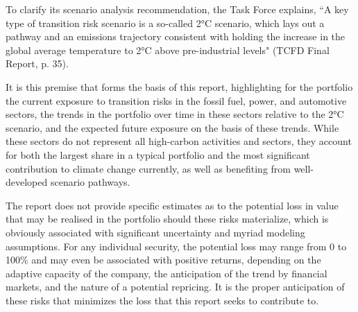 \documentclass[10pt,table,a4]{article}\usepackage[]{graphicx}\usepackage[]{color}
\begin{document}
\begin{multicols}{2}
		To clarify its scenario analysis recommendation, the Task Force explains, ``A key type of transition risk scenario is a so-called 2°C scenario, which lays out a pathway and an emissions trajectory consistent with holding the increase in the global average temperature to 2°C above pre-industrial levels" (TCFD Final Report, p. 35).
		
		It is this premise that forms the basis of this report, highlighting for the portfolio the current exposure to transition risks in the fossil fuel, power, and automotive sectors, the trends in the portfolio over time in these sectors relative to the 2°C scenario, and the expected future exposure on the basis of these trends. While these sectors do not represent all high-carbon activities and sectors, they account for both the largest share in a typical portfolio and the most significant contribution to climate change currently, as well as benefiting from well-developed scenario pathways.
		
		The report does not provide specific estimates as to the potential loss in value that may be realised in the portfolio should these risks materialize, which is obviously associated with significant uncertainty and myriad modeling assumptions. For any individual security, the potential loss may range from 0 to 100\% and may even be associated with positive returns, depending on the adaptive capacity of the company, the anticipation of the trend by financial markets, and the nature of a potential repricing. It is the proper anticipation of these risks that minimizes the loss that this report seeks to contribute to. 
		
		
		
	\end{multicols}
	
\end{document}
